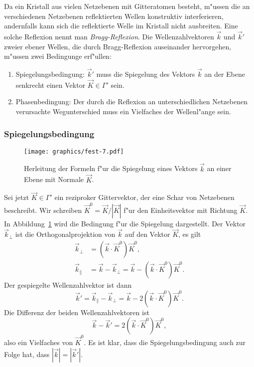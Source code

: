 Da ein Kristall aus vielen Netz\-ebenen mit Gitteratomen besteht,
m"ussen die an verschiedenen Netzebenen reflektierten Wellen konstruktiv
interferieren, andernfalls kann sich die reflektierte Welle im
Kristall nicht ausbreiten.
Eine solche Reflexion nennt man {\em Bragg-Reflexion}.
%
Die Wellenzahlvektoren $\vec k$ und $\vec k'$  zweier ebener Wellen,
die durch Bragg-Reflexion auseinander hervorgehen, m"ussen zwei
Bedingunge erf"ullen:
\begin{enumerate}
\item Spiegelungsbedingung: $\vec k'$ muss die Spiegelung des Vektors
$\vec k$ an der Ebene senkrecht einen Vektor $\vec K\in\Gamma'$ sein.
\item Phasenbedingung: Der durch die Reflexion an unterschiedlichen
Netzebenen verursachte Wegunterschied muss ein Vielfaches der Wellenl"ange
sein.
\end{enumerate}

\subsubsection{Spiegelungsbedingung}
\begin{figure}
\centering
\texttt{[image: graphics/fest-7.pdf]}
\caption{Herleitung der Formeln f"ur die Spiegelung eines Vektors $\vec k$
an einer Ebene mit Normale $\vec K$.
\label{skript:spiegelungsbedingung}}
\end{figure}
Sei jetzt $\vec K\in\Gamma'$ ein reziproker Gittervektor, der eine
Schar von Netzebenen beschreibt.
Wir schreiben $\vec K^0=\vec K/|\vec K|$ f"ur den Einheitsvektor mit
Richtung $\vec K$.
In Abbildung~\ref{skript:spiegelungsbedingung} wird die Bedingung f"ur die
Spiegelung dargestellt. 
Der Vektor $\vec k_{\perp}$ ist die Orthogonalprojektion von $\vec k$
auf den Vektor $\vec K$, es gilt
\begin{align*}
\vec k_{\perp}&=(\vec k\cdot\vec K^0)\vec K^0,
\\
\vec k_{\|}&=\vec k -\vec k_{\perp} = \vec k-(\vec k\cdot \vec K^0)\vec K^0.
\end{align*}
Der gespiegelte Wellenzahlvektor ist dann
\begin{equation}
\vec k'=\vec k_{\|}-\vec k_{\perp}=\vec k-2(\vec k\cdot\vec K^0)\vec K^0.
\end{equation}
Die Differenz der beiden Wellenzahlvektoren ist
\begin{equation}
\vec k- \vec k'=2(\vec k\cdot\vec K^0)\vec K^0,
\label{skript:wellenzahldifferenz}
\end{equation}
also ein Vielfaches von $\vec K^0$.
Es ist klar, dass die Spiegelungsbedingung auch zur Folge hat, dass
$|\vec k|=|\vec k'|$.

